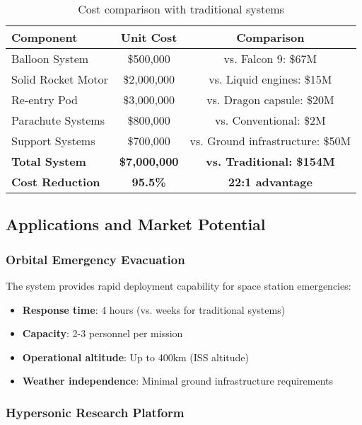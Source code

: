 \documentclass[11pt,a4paper]{article}
\begin{document}
\begin{table}[H]
\centering
\begin{tabular}{@{}lcc@{}}
\toprule
\textbf{Component} & \textbf{Unit Cost} & \textbf{Comparison} \\
\midrule
Balloon System & \$500,000 & vs. Falcon 9: \$67M \\
Solid Rocket Motor & \$2,000,000 & vs. Liquid engines: \$15M \\
Re-entry Pod & \$3,000,000 & vs. Dragon capsule: \$20M \\
Parachute Systems & \$800,000 & vs. Conventional: \$2M \\
Support Systems & \$700,000 & vs. Ground infrastructure: \$50M \\
\midrule
\textbf{Total System} & \textbf{\$7,000,000} & \textbf{vs. Traditional: \$154M} \\
\textbf{Cost Reduction} & \textbf{95.5\%} & \textbf{22:1 advantage} \\
\bottomrule
\end{tabular}
\caption{Cost comparison with traditional systems}
\label{tab:cost_analysis}
\end{table}

\subsection{Applications and Market Potential}

\subsubsection{Orbital Emergency Evacuation}

The system provides rapid deployment capability for space station emergencies:
\begin{itemize}
    \item \textbf{Response time}: 4 hours (vs. weeks for traditional systems)
    \item \textbf{Capacity}: 2-3 personnel per mission
    \item \textbf{Operational altitude}: Up to 400km (ISS altitude)
    \item \textbf{Weather independence}: Minimal ground infrastructure requirements
\end{itemize}

\subsubsection{Hypersonic Research Platform}
\end{document}

